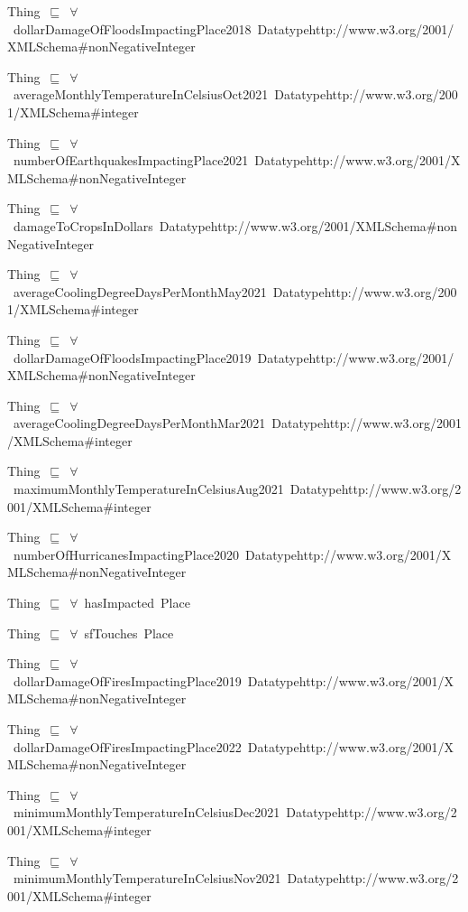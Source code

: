 \documentclass{article}
\begin{document}
Thing~\ensuremath{\sqsubseteq}~\ensuremath{\forall}~dollarDamageOfFloodsImpactingPlace2018~Datatypehttp://www.w3.org/2001/XMLSchema#nonNegativeInteger~

Thing~\ensuremath{\sqsubseteq}~\ensuremath{\forall}~averageMonthlyTemperatureInCelsiusOct2021~Datatypehttp://www.w3.org/2001/XMLSchema#integer~

Thing~\ensuremath{\sqsubseteq}~\ensuremath{\forall}~numberOfEarthquakesImpactingPlace2021~Datatypehttp://www.w3.org/2001/XMLSchema#nonNegativeInteger~

Thing~\ensuremath{\sqsubseteq}~\ensuremath{\forall}~damageToCropsInDollars~Datatypehttp://www.w3.org/2001/XMLSchema#nonNegativeInteger~

Thing~\ensuremath{\sqsubseteq}~\ensuremath{\forall}~averageCoolingDegreeDaysPerMonthMay2021~Datatypehttp://www.w3.org/2001/XMLSchema#integer~

Thing~\ensuremath{\sqsubseteq}~\ensuremath{\forall}~dollarDamageOfFloodsImpactingPlace2019~Datatypehttp://www.w3.org/2001/XMLSchema#nonNegativeInteger~

Thing~\ensuremath{\sqsubseteq}~\ensuremath{\forall}~averageCoolingDegreeDaysPerMonthMar2021~Datatypehttp://www.w3.org/2001/XMLSchema#integer~

Thing~\ensuremath{\sqsubseteq}~\ensuremath{\forall}~maximumMonthlyTemperatureInCelsiusAug2021~Datatypehttp://www.w3.org/2001/XMLSchema#integer~

Thing~\ensuremath{\sqsubseteq}~\ensuremath{\forall}~numberOfHurricanesImpactingPlace2020~Datatypehttp://www.w3.org/2001/XMLSchema#nonNegativeInteger~

Thing~\ensuremath{\sqsubseteq}~\ensuremath{\forall}~hasImpacted~Place~

Thing~\ensuremath{\sqsubseteq}~\ensuremath{\forall}~sfTouches~Place~

Thing~\ensuremath{\sqsubseteq}~\ensuremath{\forall}~dollarDamageOfFiresImpactingPlace2019~Datatypehttp://www.w3.org/2001/XMLSchema#nonNegativeInteger~

Thing~\ensuremath{\sqsubseteq}~\ensuremath{\forall}~dollarDamageOfFiresImpactingPlace2022~Datatypehttp://www.w3.org/2001/XMLSchema#nonNegativeInteger~

Thing~\ensuremath{\sqsubseteq}~\ensuremath{\forall}~minimumMonthlyTemperatureInCelsiusDec2021~Datatypehttp://www.w3.org/2001/XMLSchema#integer~

Thing~\ensuremath{\sqsubseteq}~\ensuremath{\forall}~minimumMonthlyTemperatureInCelsiusNov2021~Datatypehttp://www.w3.org/2001/XMLSchema#integer~
\end{document}
